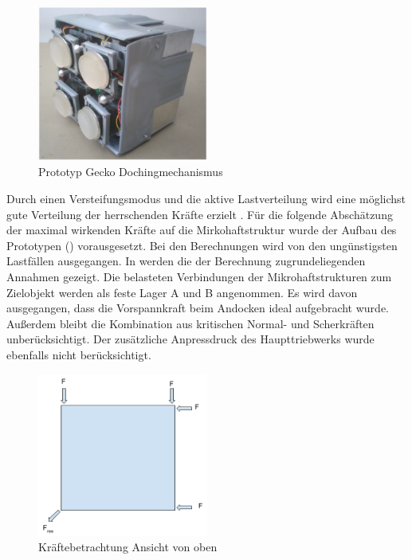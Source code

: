 \begin{figure}[h]
	\centering
		\includegraphics[width=0.50\textwidth]{graphics/Gecko3.PNG}
	\caption{Prototyp Gecko Dochingmechanismus \cite[Figure 18, Seite 10]{Moreels.}}
	\label{fig:Gecko3}
\end{figure}


Durch einen Versteifungsmodus und die aktive Lastverteilung wird eine möglichst gute Verteilung der herrschenden Kräfte erzielt \cite{ChristopherTrentlage.2018}.
Für die folgende Abschätzung der maximal wirkenden Kräfte auf die Mirkohaftstruktur wurde der Aufbau des Prototypen () vorausgesetzt. Bei den Berechnungen wird von den ungünstigsten Lastfällen ausgegangen.
In  werden die der Berechnung zugrundeliegenden Annahmen gezeigt. Die belasteten Verbindungen der Mikrohaftstrukturen zum Zielobjekt werden als feste Lager A und B angenommen. Es wird davon ausgegangen, dass die Vorspannkraft beim Andocken ideal aufgebracht wurde. Außerdem bleibt die Kombination aus kritischen Normal- und Scherkräften unberücksichtigt. Der zusätzliche Anpressdruck des Haupttriebwerks wurde ebenfalls nicht berücksichtigt.

\begin{figure}[h]
	\centering
		\includegraphics[width=0.50\textwidth]{graphics/Gecko_Rechnung1.png}
	\caption{Kräftebetrachtung Ansicht von oben}
	\label{fig:Gecko_Rechnung1}
\end{figure}


